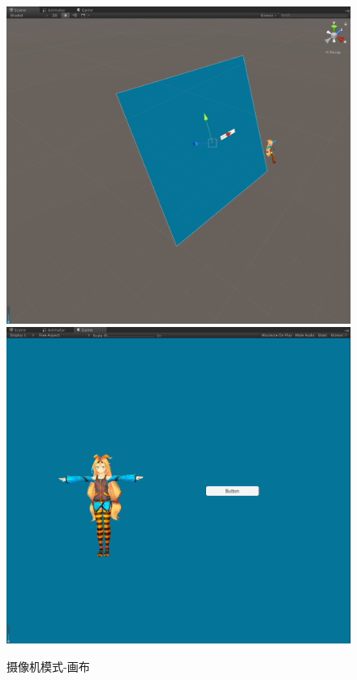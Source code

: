 \documentclass[UTF8,a4paper,12pt]{ctexbook}
\begin{document}
				\begin{figure}[H]
					\centering
					\includegraphics[scale=0.3]{Canva-1.png}
					\includegraphics[scale=0.3]{Canvas.png}
					\caption{摄像机模式-画布}
				\end{figure}
			
\end{document}
